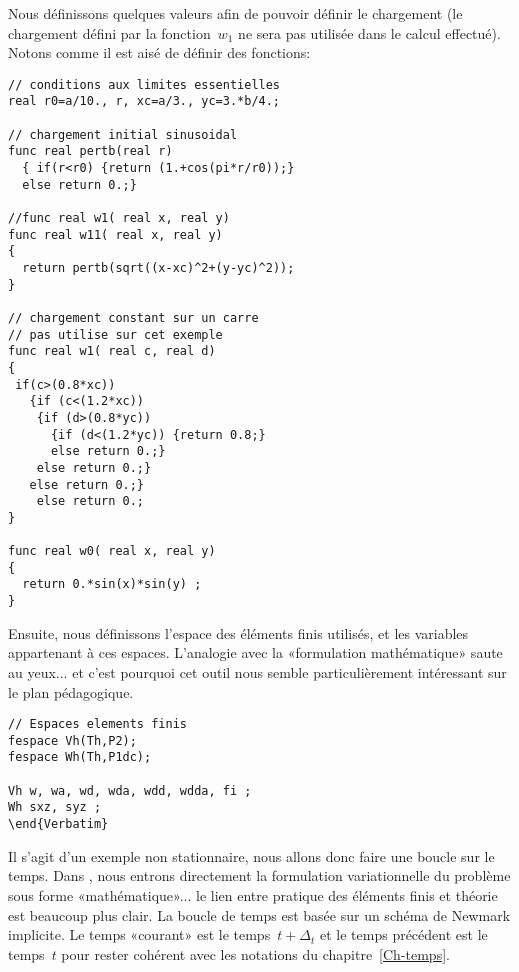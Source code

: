 \medskip
Nous définissons quelques valeurs afin de pouvoir définir le chargement (le chargement défini par la fonction~$w_1$ ne sera pas utilisée dans le calcul effectué). Notons comme il est aisé de définir des fonctions:
\begin{multicols}{2}
\begin{lstlisting}[firstnumber=last]
// conditions aux limites essentielles 
real r0=a/10., r, xc=a/3., yc=3.*b/4.; 

// chargement initial sinusoidal
func real pertb(real r)
  { if(r<r0) {return (1.+cos(pi*r/r0));}
  else return 0.;}

//func real w1( real x, real y)
func real w11( real x, real y)
{
  return pertb(sqrt((x-xc)^2+(y-yc)^2)); 
}

// chargement constant sur un carre
// pas utilise sur cet exemple
func real w1( real c, real d)
{
 if(c>(0.8*xc))
   {if (c<(1.2*xc)) 
    {if (d>(0.8*yc))
      {if (d<(1.2*yc)) {return 0.8;}
      else return 0.;}
    else return 0.;}
   else return 0.;}
	else return 0.;
}

func real w0( real x, real y)
{
  return 0.*sin(x)*sin(y) ; 
}
\end{lstlisting}
\end{multicols}

Ensuite, nous définissons l'espace des éléments finis utilisés, et les variables appartenant à ces espaces. L'analogie avec la «formulation mathématique» saute au yeux... et c'est pourquoi cet outil nous semble particulièrement intéressant sur le plan pédagogique.
\begin{lstlisting}[firstnumber=last]
// Espaces elements finis 
fespace Vh(Th,P2); 
fespace Wh(Th,P1dc);

Vh w, wa, wd, wda, wdd, wdda, fi ; 
Wh sxz, syz ; 
\end{Verbatim}
\end{lstlisting}

Il s'agit d'un exemple non stationnaire, nous allons donc faire une boucle sur le temps. Dans \freefem, nous entrons directement la formulation variationnelle du problème sous forme «mathématique»... le lien entre pratique des éléments finis et théorie est beaucoup plus clair. La boucle de temps est basée sur un schéma de Newmark implicite. Le temps «courant» est le temps~$t+\Delta_t$ et le temps précédent est le temps~$t$ pour rester cohérent avec les notations du chapitre~\ref{Ch-temps}.

